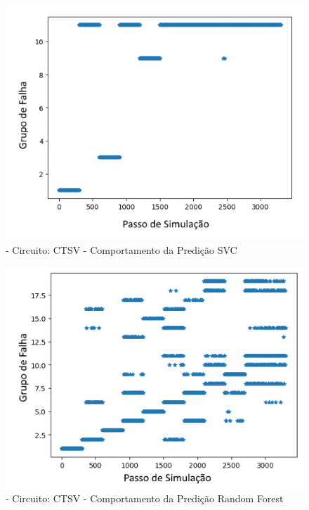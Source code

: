        
        \begin{figure}[H]
        \begin{center}
        \includegraphics[width=13cm]{./01_Pre_textuais/ctsv_figs/SVC_CTSV_mc_+_4bitPRBS_[FALHA]raw.png}
        \caption{\label{fig:DecisionTreeClassifieSalenkey}- Circuito: CTSV - Comportamento da Predição SVC}
        \end{center}
        \end{figure}
        
        \begin{figure}[H]
        \begin{center}
        \includegraphics[width=13cm]{./01_Pre_textuais/ctsv_figs/RandomForestClassifier_CTSV_mc_+_4bitPRBS_[FALHA]raw.png}
        \caption{\label{fig:DecisionTreeClassifieSalenkey}- Circuito: CTSV - Comportamento da Predição Random Forest }
        \end{center}
        \end{figure}
        
